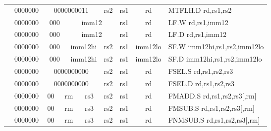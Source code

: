 \begin{table}[p]
\begin{small}
\begin{center}
\begin{tabular}{rcccccccccl}
&
\multicolumn{1}{|c|}{0000000} &
\multicolumn{5}{c|}{0000000011} &
\multicolumn{1}{c|}{rs2} &
\multicolumn{1}{c|}{rs1} &
\multicolumn{1}{c|}{rd} & MTFLH.D rd,rs1,rs2 \\
\cline{2-10}
  

&
\multicolumn{1}{|c|}{0000000} &
\multicolumn{2}{c|}{000} &
\multicolumn{4}{c|}{imm12} &
\multicolumn{1}{c|}{rs1} &
\multicolumn{1}{c|}{rd} & LF.W rd,rs1,imm12 \\
\cline{2-10}
  

&
\multicolumn{1}{|c|}{0000000} &
\multicolumn{2}{c|}{000} &
\multicolumn{4}{c|}{imm12} &
\multicolumn{1}{c|}{rs1} &
\multicolumn{1}{c|}{rd} & LF.D rd,rs1,imm12 \\
\cline{2-10}
  

&
\multicolumn{1}{|c|}{0000000} &
\multicolumn{2}{c|}{000} &
\multicolumn{3}{c|}{imm12hi} &
\multicolumn{1}{c|}{rs2} &
\multicolumn{1}{c|}{rs1} &
\multicolumn{1}{c|}{imm12lo} & SF.W imm12hi,rs1,rs2,imm12lo \\
\cline{2-10}
  

&
\multicolumn{1}{|c|}{0000000} &
\multicolumn{2}{c|}{000} &
\multicolumn{3}{c|}{imm12hi} &
\multicolumn{1}{c|}{rs2} &
\multicolumn{1}{c|}{rs1} &
\multicolumn{1}{c|}{imm12lo} & SF.D imm12hi,rs1,rs2,imm12lo \\
\cline{2-10}
  

&
\multicolumn{1}{|c|}{0000000} &
\multicolumn{5}{c|}{0000000000} &
\multicolumn{1}{c|}{rs2} &
\multicolumn{1}{c|}{rs1} &
\multicolumn{1}{c|}{rd} & FSEL.S rd,rs1,rs2,rs3 \\
\cline{2-10}
  

&
\multicolumn{1}{|c|}{0000000} &
\multicolumn{5}{c|}{0000000000} &
\multicolumn{1}{c|}{rs2} &
\multicolumn{1}{c|}{rs1} &
\multicolumn{1}{c|}{rd} & FSEL.D rd,rs1,rs2,rs3 \\
\cline{2-10}
  

&
\multicolumn{1}{|c|}{0000000} &
\multicolumn{1}{c|}{00} &
\multicolumn{2}{c|}{rm} &
\multicolumn{2}{c|}{rs3} &
\multicolumn{1}{c|}{rs2} &
\multicolumn{1}{c|}{rs1} &
\multicolumn{1}{c|}{rd} & FMADD.S rd,rs1,rs2,rs3[,rm] \\
\cline{2-10}
  

&
\multicolumn{1}{|c|}{0000000} &
\multicolumn{1}{c|}{00} &
\multicolumn{2}{c|}{rm} &
\multicolumn{2}{c|}{rs3} &
\multicolumn{1}{c|}{rs2} &
\multicolumn{1}{c|}{rs1} &
\multicolumn{1}{c|}{rd} & FMSUB.S rd,rs1,rs2,rs3[,rm] \\
\cline{2-10}
  

&
\multicolumn{1}{|c|}{0000000} &
\multicolumn{1}{c|}{00} &
\multicolumn{2}{c|}{rm} &
\multicolumn{2}{c|}{rs3} &
\multicolumn{1}{c|}{rs2} &
\multicolumn{1}{c|}{rs1} &
\multicolumn{1}{c|}{rd} & FNMSUB.S rd,rs1,rs2,rs3[,rm] \\
\cline{2-10}
  


\end{tabular}
\end{center}
\end{small}
\end{table}
